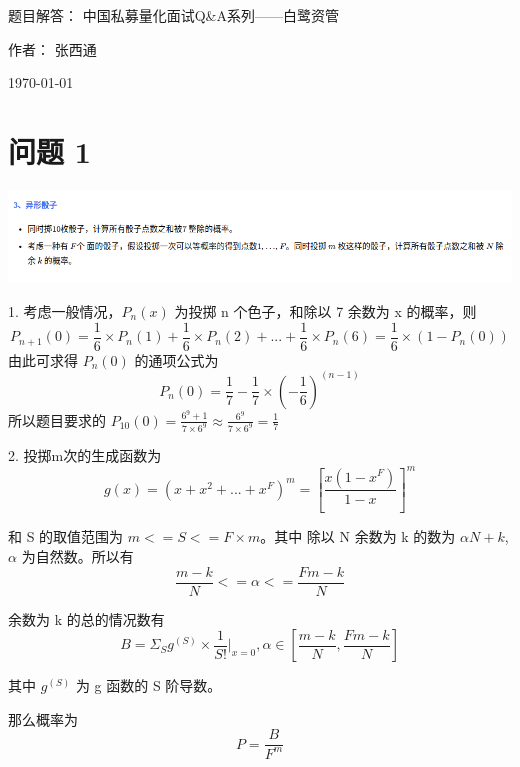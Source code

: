 \documentclass{article}
\begin{document}
\begin{titlepage}
    \centering

    \Huge{题目解答： 中国私募量化面试Q\&A系列——白鹭资管}

    \vspace{100pt}

    {\Large 作者： 张西通}

    \vspace{50pt}
    {\large \today}
\end{titlepage}

\section{问题 1}
\includegraphics[scale=0.5]{dice.png}

1. 考虑一般情况，$P_n(x)$ 为投掷 n 个色子，和除以 7 余数为 x 的概率，则
$$
P_{n+1}(0) = \frac{1}{6} \times P_n(1) + \frac{1}{6} \times P_n(2) + ... + \frac{1}{6} \times P_n(6) = \frac{1}{6} \times (1 - P_n(0)) 
$$
由此可求得 $P_n(0)$ 的通项公式为
$$
P_n(0) = \frac{1}{7} - \frac{1}{7}\times(-\frac{1}{6})^{(n-1)}
$$
所以题目要求的 $P_{10}(0) = \frac{6^9 + 1}{7 \times 6^9} \approx \frac{6^9}{7 \times 6^9} = \frac{1}{7}$

\vspace{60pt}
2. 投掷m次的生成函数为
$$
g(x) = (x + x^2 + ... + x^F)^m = [\frac{x(1-x^F)}{1-x}]^m
$$

和 S 的取值范围为 $m <= S <= F \times m $。其中 除以 N 余数为 k 的数为 $ \alpha N + k $, $\alpha$ 为自然数。所以有
$$
\frac{m-k}{N} <= \alpha <= \frac{Fm-k}{N}
$$

余数为 k 的总的情况数有
$$
B = \Sigma_S g^{(S)} \times \frac{1}{S!} |_{x=0},  \alpha \in [\frac{m-k}{N}, \frac{Fm-k}{N}] 
$$

其中 $g^{(S)}$ 为 g 函数的 S 阶导数。

那么概率为
$$
P = \frac{B}{F^m}
$$





\newpage
\end{document}

